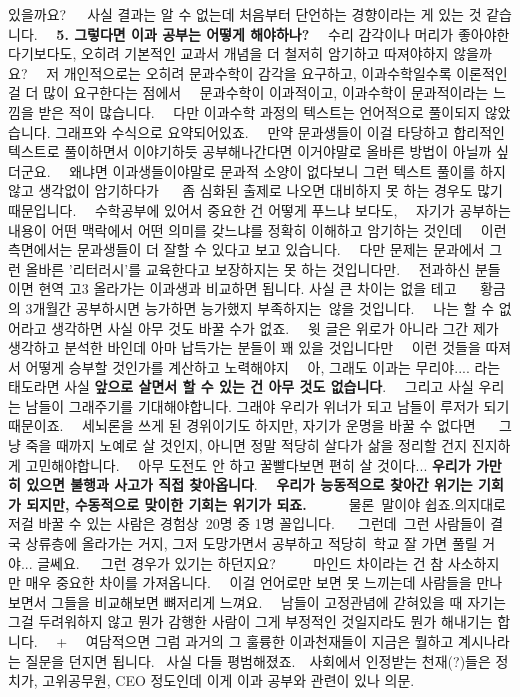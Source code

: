 있을까요?   사실 결과는 알 수 없는데 처음부터 단언하는 경향이라는 게 있는 것 같습니다.   \textbf{5. 그렇다면 이과 공부는 어떻게 해야하나?}   수리 감각이나 머리가 좋아야한다기보다도, 오히려 기본적인 교과서 개념을 더 철저히 암기하고 따져야하지 않을까요?   저 개인적으로는 오히려 문과수학이 감각을 요구하고, 이과수학일수록 이론적인 걸 더 많이 요구한다는 점에서   문과수학이 이과적이고, 이과수학이 문과적이라는 느낌을 받은 적이 많습니다.   다만 이과수학 과정의 텍스트는 언어적으로 풀이되지 않았습니다. 그래프와 수식으로 요약되어있죠.   만약 문과생들이 이걸 타당하고 합리적인 텍스트로 풀이하면서 이야기하듯 공부해나간다면 이거야말로 올바른 방법이 아닐까 싶더군요.   왜냐면 이과생들이야말로 문과적 소양이 없다보니 그런 텍스트 풀이를 하지 않고 생각없이 암기하다가    좀 심화된 출제로 나오면 대비하지 못 하는 경우도 많기 때문입니다.   수학공부에 있어서 중요한 건 어떻게 푸느냐 보다도,   자기가 공부하는 내용이 어떤 맥락에서 어떤 의미를 갖느냐를 정확히 이해하고 암기하는 것인데   이런 측면에서는 문과생들이 더 잘할 수 있다고 보고 있습니다.   다만 문제는 문과에서 그런 올바른 '리터러시'를 교육한다고 보장하지는 못 하는 것입니다만.   전과하신 분들이면 현역 고3 올라가는 이과생과 비교하면 됩니다. 사실 큰 차이는 없을 테고    황금의 3개월간 공부하시면 능가하면 능가했지 부족하지는 않을 것입니다.   나는 할 수 없어라고 생각하면 사실 아무 것도 바꿀 수가 없죠.   윗 글은 위로가 아니라 그간 제가 생각하고 분석한 바인데 아마 납득가는 분들이 꽤 있을 것입니다만   이런 것들을 따져서 어떻게 승부할 것인가를 계산하고 노력해야지   아, 그래도 이과는 무리야.... 라는 태도라면 사실 \textbf{앞으로 살면서 할 수 있는 건 아무 것도 없습니다}.   그리고 사실 우리는 남들이 그래주기를 기대해야합니다. 그래야 우리가 위너가 되고 남들이 루저가 되기 때문이죠.   세뇌론을 쓰게 된 경위이기도 하지만, 자기가 운명을 바꿀 수 없다면    그냥 죽을 때까지 노예로 살 것인지, 아니면 정말 적당히 살다가 삶을 정리할 건지 진지하게 고민해야합니다.   아무 도전도 안 하고 꿀빨다보면 편히 살 것이다... \textbf{우리가 가만히 있으면 불행과 사고가 직접 찾아옵니다}.   \textbf{우리가 능동적으로 찾아간 위기는 기회가 되지만, 수동적으로 맞이한 기회는 위기가 되죠.}      물론 말이야 쉽죠.의지대로 저걸 바꿀 수 있는 사람은 경험상 20명 중 1명 꼴입니다.    그런데 그런 사람들이 결국 상류층에 올라가는 거지, 그저 도망가면서 공부하고 적당히 학교 잘 가면 풀릴 거야... 글쎄요.   그런 경우가 있기는 하던지요?      마인드 차이라는 건 참 사소하지만 매우 중요한 차이를 가져옵니다.   이걸 언어로만 보면 못 느끼는데 사람들을 만나보면서 그들을 비교해보면 뼈저리게 느껴요.   남들이 고정관념에 갇혀있을 때 자기는 그걸 두려워하지 않고 뭔가 감행한 사람이 그게 부정적인 것일지라도 뭔가 해내기는 합니다.   +   여담적으면 그럼 과거의 그 훌륭한 이과천재들이 지금은 뭘하고 계시나라는 질문을 던지면 됩니다.  사실 다들 평범해졌죠.  사회에서 인정받는 천재(?)들은 정치가, 고위공무원, CEO 정도인데 이게 이과 공부와 관련이 있나 의문.  